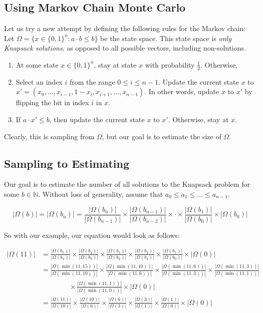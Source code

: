\documentclass[12pt]{article}
\theoremstyle{definition}
\begin{document}
\subsection*{Using Markov Chain Monte Carlo}
Let us try a new attempt by defining the following rules for the Markov chain:
Let $\Omega=\{x\in\{0,1\}^n:a\cdot b\leq b\}$ be the state space. This state space is \textit{only Knapsack solutions}, as opposed to all possible vectors, including non-solutions. 
\begin{enumerate}
	\item At some state $x\in\{0,1\}^n$, stay at state $x$ with probability $\frac{1}{2}$. Otherwise,
	\item Select an index $i$ from the range $0\leq i\leq n-1$. Update the current state $x$ to $x' = (x_0,\dots,x_{i-1}, 1-x_i, x_{i+1},\dots, x_{n-1})$. In other words, update $x$ to $x'$ by flipping the bit in index $i$ in $x$. 
	\item If $a\cdot x'\leq b$, then update the current state $x$ to $x'$. Otherwise, stay at $x$.
 \end{enumerate}
Clearly, this is sampling from $\Omega$, but our goal is to estimate the size of $\Omega$. 

\subsection*{Sampling to Estimating}
Our goal is to estimate the number of all solutions to the Knapsack problem for some $b\in\mathbb{N}$. 
Without loss of generality, assume that $a_0\leq a_1 \leq \dots \leq a_{n-1}$. 

\begin{equation}
	|\Omega(b)| = |\Omega(b_n)| = \frac{|\Omega(b_n)|}{|\Omega(b_{n-1})|} \times \frac{|\Omega(b_{n-1})|}{|\Omega(b_{n-2})|} \times \cdot \times \frac{|\Omega(b_{1})|}{|\Omega(b_{0})|} \times |\Omega(b_0)|
\end{equation}

So with our example, our equation would look as follows:
\begin{example}
	\begin{align}
		|\Omega(11)| &= \frac{|\Omega(b_5)|}{|\Omega(b_4)|} \times \frac{|\Omega(b_4)|}{|\Omega(b_3)|} \times \frac{|\Omega(b_3)|}{|\Omega(b_2)|} \times \frac{|\Omega(b_2)|}{|\Omega(b_1)|} \times \frac{|\Omega(b_1)|}{|\Omega(b_0)|} \times |\Omega(0)| \\ 
		&= \frac{|\Omega(\min(11,15))|}{|\Omega(\min(11,10))|} \times \frac{|\Omega(\min(11,10))|}{|\Omega(\min(11,6))|} \times \frac{|\Omega(\min(11,6))|}{|\Omega(\min(11,3))|} \times \frac{|\Omega(\min(11,3))|}{|\Omega(\min(11,1))|}\\
		& \qquad \qquad \times \frac{|\Omega(\min(11,1))|}{|\Omega(\min(11,0))|} \times |\Omega(0)|\\ 
		&= \frac{|\Omega(11)|}{|\Omega(10)|} \times \frac{|\Omega(10)|}{|\Omega(6)|} \times \frac{|\Omega(6)|}{|\Omega(3)|} \times \frac{|\Omega(3)|}{|\Omega(1)|} \times \frac{|\Omega(1)|}{|\Omega(0)|} \times |\Omega(0)|
	\end{align}
\end{example}
\end{document}
